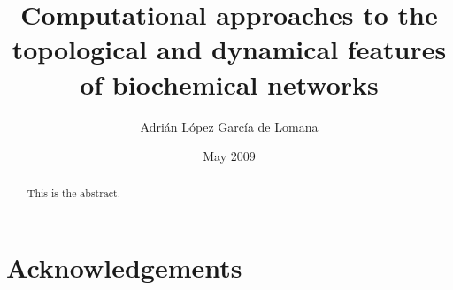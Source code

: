 \title{Computational approaches to the topological and dynamical features of biochemical networks}
\author{Adri\'an L\'opez Garc\'ia de Lomana}
\date{May 2009}
\maketitle
{}
\tableofcontents
\listoffigures
\listoftables
\chapter*{Acknowledgements}
\begin{abstract}
This is the abstract.
\end{abstract}
